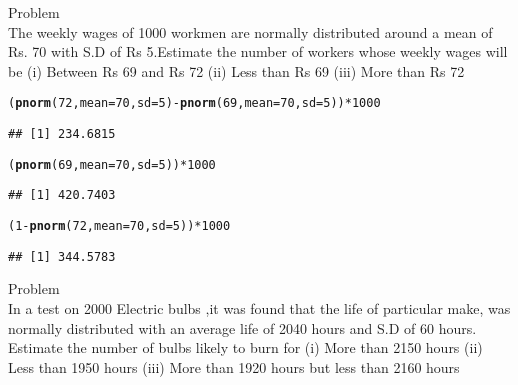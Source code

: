 \documentclass{article}\usepackage[]{graphicx}\usepackage[]{xcolor}
\makeatletter
\newcommand{\hlnum}[1]{\textcolor[rgb]{0.686,0.059,0.569}{#1}}%
\newcommand{\hlopt}[1]{\textcolor[rgb]{0,0,0}{#1}}%
\newcommand{\hldef}[1]{\textcolor[rgb]{0.345,0.345,0.345}{#1}}%
\newcommand{\hlkwc}[1]{\textcolor[rgb]{0.333,0.667,0.333}{#1}}%
\newcommand{\hlkwd}[1]{\textcolor[rgb]{0.737,0.353,0.396}{\textbf{#1}}}%
\newenvironment{kframe}{%
 \def\at@end@of@kframe{}%
 \ifinner\ifhmode%
  \def\at@end@of@kframe{\end{minipage}}%
  \begin{minipage}{\columnwidth}%
 \fi\fi%
 \def\FrameCommand##1{\hskip\@totalleftmargin \hskip-\fboxsep
 \colorbox{shadecolor}{##1}\hskip-\fboxsep
     \hskip-\linewidth \hskip-\@totalleftmargin \hskip\columnwidth}%
 \MakeFramed {\advance\hsize-\width
   \@totalleftmargin\z@ \linewidth\hsize
   \@setminipage}}%
 {\par\unskip\endMakeFramed%
 \at@end@of@kframe}
\newenvironment{knitrout}{}{} %
\makeatother
\begin{document}
Problem\\
The weekly wages of 1000 workmen are normally distributed around a mean of Rs. 70 with S.D of Rs 5.Estimate the number of workers whose weekly wages will be
(i) Between Rs 69 and Rs 72
(ii) Less than Rs 69
(iii) More than Rs 72\\
\begin{knitrout}
\color{fgcolor}\begin{kframe}
\begin{alltt}
\hldef{(} \hlkwd{pnorm}\hldef{(}\hlnum{72}\hldef{,} \hlkwc{mean}\hldef{=}\hlnum{70}\hldef{,} \hlkwc{sd}\hldef{=}\hlnum{5}\hldef{)} \hlopt{-} \hlkwd{pnorm}\hldef{(}\hlnum{69}\hldef{,} \hlkwc{mean}\hldef{=}\hlnum{70}\hldef{,} \hlkwc{sd}\hldef{=}\hlnum{5}\hldef{))}\hlopt{*}\hlnum{1000}
\end{alltt}
\begin{verbatim}
## [1] 234.6815
\end{verbatim}
\end{kframe}
\end{knitrout}
\begin{knitrout}
\color{fgcolor}\begin{kframe}
\begin{alltt}
\hldef{(}\hlkwd{pnorm}\hldef{(}\hlnum{69}\hldef{,} \hlkwc{mean}\hldef{=}\hlnum{70}\hldef{,} \hlkwc{sd}\hldef{=}\hlnum{5}\hldef{))}\hlopt{*}\hlnum{1000}
\end{alltt}
\begin{verbatim}
## [1] 420.7403
\end{verbatim}
\end{kframe}
\end{knitrout}
\begin{knitrout}
\color{fgcolor}\begin{kframe}
\begin{alltt}
\hldef{(}\hlnum{1} \hlopt{-} \hlkwd{pnorm}\hldef{(}\hlnum{72}\hldef{,} \hlkwc{mean}\hldef{=}\hlnum{70}\hldef{,} \hlkwc{sd}\hldef{=}\hlnum{5}\hldef{))}\hlopt{*}\hlnum{1000}
\end{alltt}
\begin{verbatim}
## [1] 344.5783
\end{verbatim}
\end{kframe}
\end{knitrout}
Problem\\
In a test on 2000 Electric bulbs ,it was found that the life of particular make, was normally distributed with an average life of 2040 hours and S.D of 60 hours. Estimate the number of bulbs likely to burn for
(i) More than 2150 hours
(ii) Less than 1950 hours
(iii) More than 1920 hours but less than 2160 hours
\end{document}
